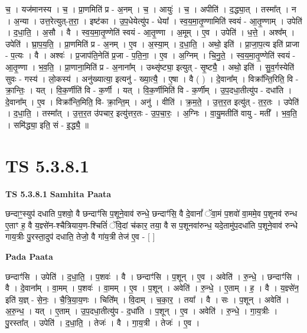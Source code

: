 \documentclass[17pt]{extarticle}
\begin{document}
च॒ । यज॑मानस्य । च॒ । प्रा॒णमिति॑ प्र - अ॒नम् । च॒ । आयुः॑ । च॒ । अपीति॑ । द॒द्ध्या॒त् । तस्मा᳚त् । न । अ॒न्या । उत्त॒रेत्युत्-त॒रा॒ । इष्ट॑का । उ॒प॒धेयेत्यु॑प - धेया᳚ । स्व॒य॒मा॒तृ॒ण्णामिति॑ स्वयं - आ॒तृ॒ण्णाम् । उपेति॑ । द॒धा॒ति॒ । अ॒सौ । वै । स्व॒य॒मा॒तृ॒ण्णेति॑ स्वयं - आ॒तृ॒ण्णा । अ॒मूम् । ए॒व । उपेति॑ । ध॒त्ते॒ । अश्व᳚म् । उपेति॑ । घ्रा॒प॒य॒ति॒ । प्रा॒णमिति॑ प्र - अ॒नम् । ए॒व । अ॒स्या॒म् । द॒धा॒ति॒ । अथो॒ इति॑ । प्रा॒जा॒प॒त्य इति॑ प्राजा - प॒त्यः । वै । अश्वः॑ । प्र॒जाप॑ति॒नेति॑ प्र॒जा - प॒ति॒ना॒ । ए॒व । अ॒ग्निम् । चि॒नु॒ते॒ । स्व॒य॒मा॒तृ॒ण्णेति॑ स्वयं - आ॒तृ॒ण्णा । भ॒व॒ति॒ । प्रा॒णाना॒मिति॑ प्र - अ॒नाना᳚म् । उथ्सृ॑ष्ट्या॒ इत्युत् - सृ॒ष्ट्यै॒ । अथो॒ इति॑ । सु॒व॒र्गस्येति॑ सुवः - गस्य॑ । लो॒कस्य॑ । अनु॑ख्यात्या॒ इत्यनु॑ - ख्या॒त्यै॒ । ए॒षा । वै ( ) । दे॒वाना᳚म् । विक्रा᳚न्ति॒रिति॒ वि - क्रा॒न्तिः॒ । यत् । वि॒क॒र्णीति॑ वि - क॒र्णी । यत् । वि॒क॒र्णीमिति॑ वि - क॒र्णीम् । उ॒प॒दधा॒तीत्यु॑प - दधा॑ति । दे॒वाना᳚म् । ए॒व । विक्रा᳚न्ति॒मिति॒ वि- क्रा॒न्ति॒म् । अनु॑ । वीति॑ । क्र॒म॒ते॒ । उ॒त्त॒र॒त इत्यु॑त् - त॒र॒तः । उपेति॑ । द॒धा॒ति॒ । तस्मा᳚त् । उ॒त्त॒र॒त उ॑पचार॒ इत्यु॑त्तर॒तः - उ॒प॒चा॒रः॒ । अ॒ग्निः । वा॒यु॒मतीति॑ वायु - मती᳚ । भ॒व॒ति॒ । समि॑द्ध्या॒ इति॒ सं - इ॒द्ध्यै॒ ॥  \newline





\section{ TS 5.3.8.1 }

\textbf{TS 5.3.8.1 } \newline
\textbf{Samhita Paata} \newline

छन्दाꣳ॒॒स्युप॑ दधाति प॒शवो॒ वै छन्दाꣳ॑सि प॒शूने॒वाव॑ रुन्धे॒ छन्दाꣳ॑सि॒ वै दे॒वानां᳚ ॅवा॒मं प॒शवो॑ वा॒ममे॒व प॒शूनव॑ रुन्ध ए॒ताꣳ ह॒ वै य॒ज्ञ्से॑न-श्चैत्रियाय॒ण-श्चितिं॑ ॅवि॒दां च॑कार॒ तया॒ वै स प॒शूनवा॑रुन्ध॒ यदे॒तामु॑प॒दधा॑ति प॒शूने॒वाव॑ रुन्धे गाय॒त्रीः पु॒रस्ता॒दुप॑ दधाति॒ तेजो॒ वै गा॑य॒त्री तेज॑ ए॒व - [  ] \newline

\textbf{Pada Paata} \newline

छन्दाꣳ॑सि । उपेति॑ । द॒धा॒ति॒ । प॒शवः॑ । वै । छन्दाꣳ॑सि । प॒शून् । ए॒व । अवेति॑ । रु॒न्धे॒ । छन्दाꣳ॑सि । वै । दे॒वाना᳚म् । वा॒मम् । प॒शवः॑ । वा॒मम् । ए॒व । प॒शून् । अवेति॑ । रु॒न्धे॒ । ए॒ताम् । ह॒ । वै । य॒ज्ञ्से॑न॒ इति॑ य॒ज्ञ् - से॒नः॒ । चै॒त्रि॒या॒य॒णः । चिति᳚म् । वि॒दाम् । च॒का॒र॒ । तया᳚ । वै । सः । प॒शून् । अवेति॑ । अ॒रु॒न्ध॒ । यत् । ए॒ताम् । उ॒प॒दधा॒तीत्यु॑प - द॒धा॑ति । प॒शून् । ए॒व । अवेति॑ । रु॒न्धे॒ । गा॒य॒त्रीः । पु॒रस्ता᳚त् । उपेति॑ । द॒धा॒ति॒ । तेजः॑ । वै । गा॒य॒त्री । तेजः॑ । ए॒व ।  \newline
\end{document}
